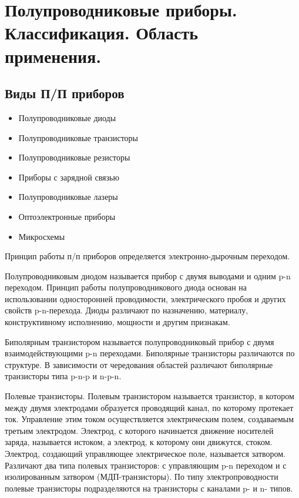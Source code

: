 



\section{Полупроводниковые приборы. Классификация. Область применения.}

\subsection*{Виды П/П приборов}

\begin{itemize}
\item Полупроводниковые диоды
\item Полупроводниковые транзисторы
\item Полупроводниковые резисторы
\item Приборы с зарядной связью
\item Полупроводниковые лазеры
\item Оптоэлектронные приборы
\item Микросхемы
\end{itemize}

Принцип работы п/п приборов определяется электронно-дырочным переходом.

Полупроводниковым диодом называется прибор с двумя выводами и одним p-n переходом. Принцип работы полупроводникового диода основан на использовании односторонней проводимости, электрического пробоя и других свойств p-n-перехода. Диоды различают по назначению, материалу, конструктивному исполнению, мощности и другим признакам.

Биполярным транзистором называется полупроводниковый прибор с двумя взаимодействующими p-n переходами. Биполярные транзисторы различаются по структуре. В зависимости от чередования областей различают биполярные транзисторы типа p-n-p и n-p-n.

Полевые транзисторы. Полевым транзистором называется транзистор, в котором между двумя электродами образуется проводящий канал, по которому протекает ток. Управление этим током осуществляется электрическим полем, создаваемым третьим электродом. Электрод, с которого начинается движение носителей заряда, называется истоком, а электрод, к которому они движутся, стоком. Электрод, создающий управляющее электрическое поле, называется затвором. Различают два типа полевых транзисторов: с управляющим p-n переходом и с изолированным затвором (МДП-транзисторы). По типу электропроводности полевые транзисторы подразделяются на транзисторы с каналами p- и n- типов.

